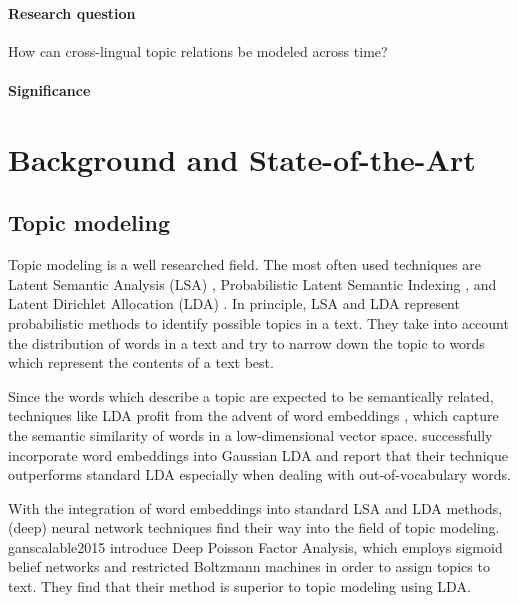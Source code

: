 \paragraph{Research question}
How can cross-lingual topic relations be modeled across time?

\paragraph{Significance}

\section{Background and State-of-the-Art}

\subsection{Topic modeling}
Topic modeling is a well researched field. The most often used techniques are Latent Semantic Analysis (LSA) \citep{deerwesterscottindexing1990}, Probabilistic Latent Semantic Indexing \citep{hofmannprobabilistic1999}, and Latent Dirichlet Allocation (LDA) \citep{bleidynamic2006}. In principle, LSA and LDA represent probabilistic methods to identify possible topics in a text. They take into account the distribution of words in a text and try to narrow down the topic to words which represent the contents of a text best.

Since the words which describe a topic are expected to be semantically related, techniques like LDA profit from the advent of word embeddings \citep{mikolovdistributed2013,bengioneural2003}, which capture the semantic similarity of words in a low-dimensional vector space. \citet{dasgaussian2015} successfully incorporate word embeddings into Gaussian LDA and report that their technique outperforms standard LDA especially when dealing with out-of-vocabulary words.

With the integration of word embeddings into standard LSA and LDA methods, (deep) neural network techniques find their way into the field of topic modeling. ganscalable2015 introduce Deep Poisson Factor Analysis, which employs sigmoid belief networks and restricted Boltzmann machines in order to assign topics to text. They find that their method is superior to topic modeling using LDA.

